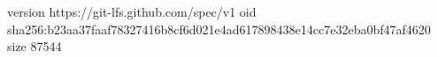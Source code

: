 version https://git-lfs.github.com/spec/v1
oid sha256:b23aa37faaf78327416b8cf6d021e4ad617898438e14cc7e32eba0bf47af4620
size 87544
